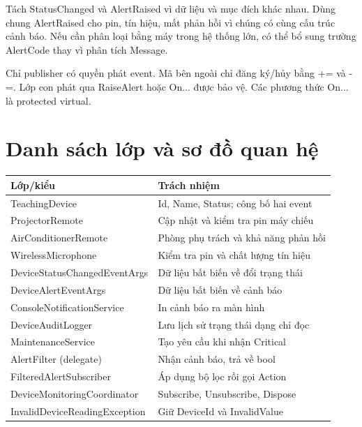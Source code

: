 \documentclass[11pt,a4paper]{article}
\begin{document}
Tách StatusChanged và AlertRaised vì dữ liệu và mục đích khác nhau. Dùng chung AlertRaised cho pin, tín hiệu, mất phản hồi vì chúng có cùng cấu trúc cảnh báo. Nếu cần phân loại bằng máy trong hệ thống lớn, có thể bổ sung trường AlertCode thay vì phân tích Message.

Chỉ publisher có quyền phát event. Mã bên ngoài chỉ đăng ký/hủy bằng += và -=. Lớp con phát qua RaiseAlert hoặc On... được bảo vệ. Các phương thức On... là protected virtual.
\newpage
\section{Danh sách lớp và sơ đồ quan hệ}
\begin{tabularx}{\linewidth}{@{}p{6.5cm}X@{}}\toprule
Lớp/kiểu & Trách nhiệm\\\midrule
TeachingDevice & Id, Name, Status; công bố hai event\\
ProjectorRemote & Cập nhật và kiểm tra pin máy chiếu\\
AirConditionerRemote & Phòng phụ trách và khả năng phản hồi\\
WirelessMicrophone & Kiểm tra pin và chất lượng tín hiệu\\
DeviceStatusChangedEventArgs & Dữ liệu bất biến về đổi trạng thái\\
DeviceAlertEventArgs & Dữ liệu bất biến về cảnh báo\\
ConsoleNotificationService & In cảnh báo ra màn hình\\
DeviceAuditLogger & Lưu lịch sử trạng thái dạng chỉ đọc\\
MaintenanceService & Tạo yêu cầu khi nhận Critical\\
AlertFilter (delegate) & Nhận cảnh báo, trả về bool\\
FilteredAlertSubscriber & Áp dụng bộ lọc rồi gọi Action\\
DeviceMonitoringCoordinator & Subscribe, Unsubscribe, Dispose\\
InvalidDeviceReadingException & Giữ DeviceId và InvalidValue\\\bottomrule
\end{tabularx}
\end{document}
